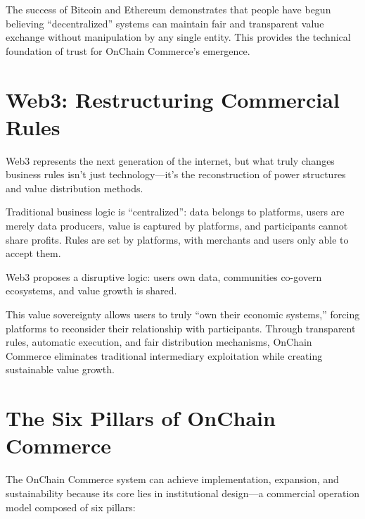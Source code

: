 \documentclass[
  Letterpaper,
]{scrbook}
\begin{document}
The success of Bitcoin and Ethereum demonstrates that people have begun
believing ``decentralized'' systems can maintain fair and transparent
value exchange without manipulation by any single entity. This provides
the technical foundation of trust for OnChain Commerce's emergence.

\section*{Web3: Restructuring Commercial
Rules}\label{web3-restructuring-commercial-rules}


Web3 represents the next generation of the internet, but what truly
changes business rules isn't just technology---it's the reconstruction
of power structures and value distribution methods.

Traditional business logic is ``centralized'': data belongs to
platforms, users are merely data producers, value is captured by
platforms, and participants cannot share profits. Rules are set by
platforms, with merchants and users only able to accept them.

Web3 proposes a disruptive logic: users own data, communities co-govern
ecosystems, and value growth is shared.

This value sovereignty allows users to truly ``own their economic
systems,'' forcing platforms to reconsider their relationship with
participants. Through transparent rules, automatic execution, and fair
distribution mechanisms, OnChain Commerce eliminates traditional
intermediary exploitation while creating sustainable value growth.

\section*{The Six Pillars of OnChain
Commerce}\label{the-six-pillars-of-onchain-commerce}


The OnChain Commerce system can achieve implementation, expansion, and
sustainability because its core lies in institutional design---a
commercial operation model composed of six pillars:
\end{document}

